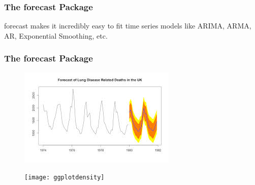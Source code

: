 \documentclass{beamer}
\begin{document}
\begin{frame}
\frametitle{The forecast Package}	
	
forecast makes it incredibly easy to fit time series models like ARIMA, ARMA, AR, Exponential Smoothing, etc.

	
	
\end{frame}


\begin{frame}
	\frametitle{The forecast Package}	
	
	\begin{figure}
\centering
\includegraphics[width=0.7\linewidth]{forecast}

\end{figure}

	
	
\end{frame}
\begin{frame}
	
	
	
	
	\begin{figure}
\centering
\texttt{[image: ggplotdensity]}
\caption{}
\label{fig:ggplotdensity}
\end{figure}

\end{frame}
\end{document}
